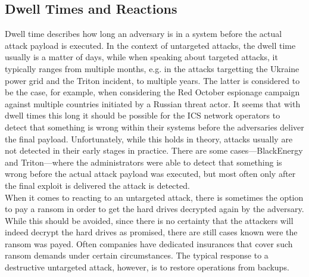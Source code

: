 \documentclass[runningheads]{llncs}
\begin{document}
\subsection{Dwell Times and Reactions}
Dwell time describes how long an adversary is in a system before the actual attack payload is executed.
In the context of untargeted attacks, the dwell time usually is a matter of days, while when speaking about targeted attacks, it typically ranges from multiple months, e.g. in the attacks targetting the Ukraine power grid and the Triton incident, to multiple years.
The latter is considered to be the case, for example, when considering the Red October espionage campaign against multiple countries initiated by a Russian threat actor.
It seems that with dwell times this long it should be possible for the ICS network operators to detect that something is wrong within their systems before the adversaries deliver the final payload.
Unfortunately, while this holds in theory, attacks usually are not detected in their early stages in practice.
There are some cases---BlackEnergy and Triton---where the administrators were able to detect that something is wrong before the actual attack payload was executed, but most often only after the final exploit is delivered the attack is detected.\\
When it comes to reacting to an untargeted attack, there is sometimes the option to pay a ransom in order to get the hard drives decrypted again by the adversary.
While this should be avoided, since there is no certainty that the attackers will indeed decrypt the hard drives as promised, there are still cases known were the ransom was payed.
Often companies have dedicated insurances that cover such ransom demands under certain circumstances.
The typical response to a destructive untargeted attack, however, is to restore operations from backups.
\end{document}
